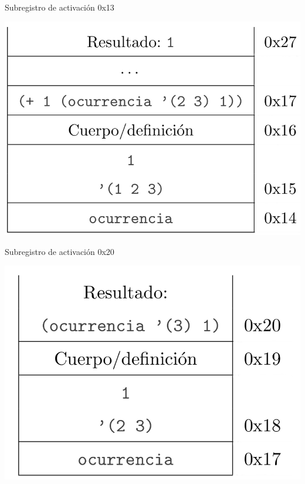 
\begin{multicols}{2}
Subregistro de activación 0x13
\begin{center}
        \includegraphics[scale=0.3]{./R2}
\end{center}

Subregistro de activación 0x20
\begin{center}
        \includegraphics[scale=0.3]{./R3}
\end{center}


\end{multicols}
